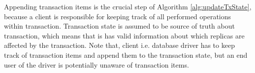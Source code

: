 Appending transaction items is the crucial step of Algorithm \ref{alg:updateTxState}, because a client is responsible for keeping track of all performed operations within transaction. Transaction state is assumed to be source of truth about transaction, which means that is has valid information about which replicas are affected by the transaction.
Note that, client i.e. database driver has to keep track of transaction items and append them to the transaction state, but an end user of the driver is potentially unaware of transaction items.

